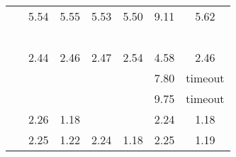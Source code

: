 \begin{table}[htb]
\begin{tabular}{|c|c|c|c|c|c|c |}
   ~\cite[Example 5]{plump2018modular} & 5.54
    &5.55
    & 5.53& 5.50& 9.11&  5.62  \\
   ~\cite[Example 6]{plump2018modular} &  &  & & &  &   \\
   ~\cite[Example 4]{bruggink2015proving} &
    2.44
    & 
    2.46
    & 
    2.47
    &
    2.54
    & 4.58 & 
    2.46
     \\
   ~\cite[Example 5]{bruggink2015proving} &  &  &&& 7.80& timeout  \\
   ~\cite[Example 6]{bruggink2015proving} &  &  &&& 9.75& timeout   \\
   ~\cite[Example 1]{bruggink2014termination} & 
     2.26
     &1.18
     & & &2.24
     & 1.18  
     \\
   ~\cite[Example 4]{bruggink2014termination} &  2.25
    & 1.22 & 2.24
    &1.18
    &2.25
    & 1.19 


\end{tabular}
\end{table}
